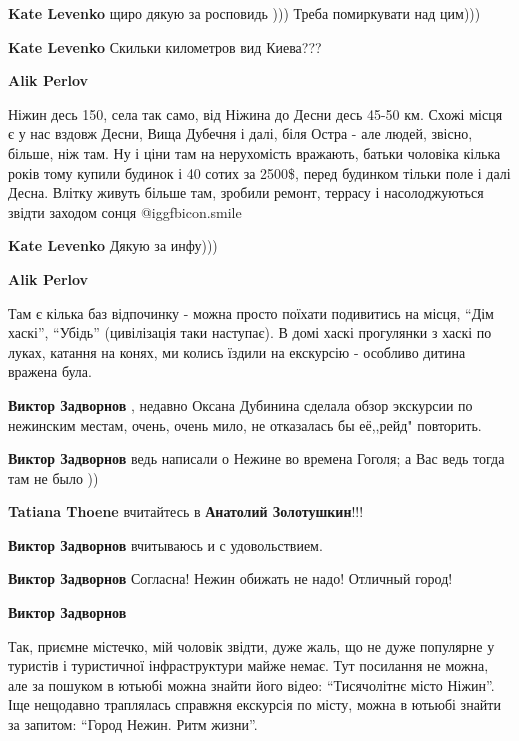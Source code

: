 \begin{itemize}
\begin{itemize}
\begin{itemize}
\textbf{Kate Levenko} щиро дякую за росповидь ))) Треба помиркувати над цим)))

\textbf{Kate Levenko} Скильки километров вид Киева???

\textbf{Alik Perlov} 

Ніжин десь 150, села так само, від Ніжина до Десни десь 45-50 км. Схожі місця є
у нас вздовж Десни, Вища Дубечня і далі, біля Остра - але людей, звісно,
більше, ніж там. Ну і ціни там на нерухомість вражають, батьки чоловіка кілька
років тому купили будинок і 40 сотих за 2500\$, перед будинком тільки поле і
далі Десна. Влітку живуть більше там, зробили ремонт, террасу і насолоджуються
звідти заходом сонця  @igg{fbicon.smile} 


\textbf{Kate Levenko} Дякую за инфу)))

\textbf{Alik Perlov} 

Там є кілька баз відпочинку - можна просто поїхати подивитись на місця, \enquote{Дім
хаскі}, \enquote{Убідь} (цивілізація таки наступає). В домі хаскі прогулянки з хаскі по
луках, катання на конях, ми колись їздили на екскурсію - особливо дитина
вражена була.

\end{itemize} %

\textbf{Виктор Задворнов} , недавно Оксана Дубинина сделала обзор экскурсии по нежинским местам, очень, очень мило, не отказалась бы её,,рейд" повторить.

\textbf{Виктор Задворнов} ведь написали о Нежине во времена Гоголя; а Вас ведь тогда там не было ))

\begin{itemize} %
\textbf{Tatiana Thoene} вчитайтесь в \textbf{Анатолий Золотушкин}!!!

\textbf{Виктор Задворнов} вчитываюсь и с удовольствием.
\end{itemize} %

\textbf{Виктор Задворнов} Согласна! Нежин обижать не надо! Отличный город!

\textbf{Виктор Задворнов} 

Так, приємне містечко, мій чоловік звідти, дуже жаль, що не дуже популярне у
туристів і туристичної інфраструктури майже немає. Тут посилання не можна, але
за пошуком в ютьюбі можна знайти його відео: \enquote{Тисячолітнє місто Ніжин}. Іще
нещодавно траплялась справжня екскурсія по місту, можна в ютьюбі знайти за
запитом: \enquote{Город Нежин. Ритм жизни}.



\end{itemize}
\end{itemize}
